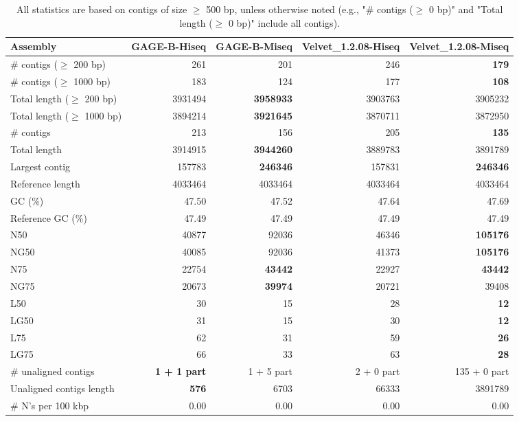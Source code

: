 \documentclass[12pt,a4paper]{article}
\begin{document}
\begin{table}[ht]
\begin{center}
\caption{All statistics are based on contigs of size $\geq$ 500 bp, unless otherwise noted (e.g., "\# contigs ($\geq$ 0 bp)" and "Total length ($\geq$ 0 bp)" include all contigs).}
\begin{tabular}{|l*{4}{|r}|}
\hline
Assembly & GAGE-B-Hiseq & GAGE-B-Miseq & Velvet\_1.2.08-Hiseq & Velvet\_1.2.08-Miseq \\ \hline
\# contigs ($\geq$ 200 bp) & 261 & 201 & 246 & {\bf 179} \\ \hline
\# contigs ($\geq$ 1000 bp) & 183 & 124 & 177 & {\bf 108} \\ \hline
Total length ($\geq$ 200 bp) & 3931494 & {\bf 3958933} & 3903763 & 3905232 \\ \hline
Total length ($\geq$ 1000 bp) & 3894214 & {\bf 3921645} & 3870711 & 3872950 \\ \hline
\# contigs & 213 & 156 & 205 & {\bf 135} \\ \hline
Total length & 3914915 & {\bf 3944260} & 3889783 & 3891789 \\ \hline
Largest contig & 157783 & {\bf 246346} & 157831 & {\bf 246346} \\ \hline
Reference length & 4033464 & 4033464 & 4033464 & 4033464 \\ \hline
GC (\%) & 47.50 & 47.52 & 47.64 & 47.69 \\ \hline
Reference GC (\%) & 47.49 & 47.49 & 47.49 & 47.49 \\ \hline
N50 & 40877 & 92036 & 46346 & {\bf 105176} \\ \hline
NG50 & 40085 & 92036 & 41373 & {\bf 105176} \\ \hline
N75 & 22754 & {\bf 43442} & 22927 & {\bf 43442} \\ \hline
NG75 & 20673 & {\bf 39974} & 20721 & 39408 \\ \hline
L50 & 30 & 15 & 28 & {\bf 12} \\ \hline
LG50 & 31 & 15 & 30 & {\bf 12} \\ \hline
L75 & 62 & 31 & 59 & {\bf 26} \\ \hline
LG75 & 66 & 33 & 63 & {\bf 28} \\ \hline
\# unaligned contigs & {\bf 1 + 1 part} & 1 + 5 part & 2 + 0 part & 135 + 0 part \\ \hline
Unaligned contigs length & {\bf 576} & 6703 & 66333 & 3891789 \\ \hline
\# N's per 100 kbp & 0.00 & 0.00 & 0.00 & 0.00 \\ \hline
\end{tabular}
\end{center}
\end{table}
\end{document}
